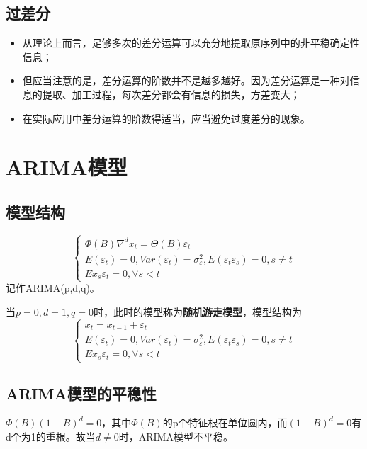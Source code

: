 \documentclass[12pt, a4paper, oneside]{ctexbook}
\begin{document}
\subsection{过差分}
\begin{itemize}
    \item 从理论上而言，足够多次的差分运算可以充分地提取原序列中的非平稳确定性信息；
    \item 但应当注意的是，差分运算的阶数并不是越多越好。因为差分运算是一种对信息的提取、加工过程，每次差分都会有信息的损失，方差变大；
    \item 在实际应用中差分运算的阶数得适当，应当避免过度差分的现象。
\end{itemize}

\section{ARIMA模型}
\subsection{模型结构}
\begin{equation}
    \begin{cases}
        \Phi(B)\nabla^dx_t=\Theta(B)\varepsilon_t\\
        E(\varepsilon_t)=0,Var(\varepsilon_t)=\sigma_\varepsilon^2,E(\varepsilon_t\varepsilon_s)=0,s\neq t\\
        Ex_s\varepsilon_t=0,\forall s<t
    \end{cases}
\end{equation}
记作ARIMA(p,d,q)。

当$p=0,d=1,q =0$时，此时的模型称为\textbf{随机游走模型}，模型结构为
$$
\begin{cases}
    x_t=x_{t-1}+\varepsilon_t\\
    E(\varepsilon_t)=0,Var(\varepsilon_t)=\sigma_\varepsilon^2,E(\varepsilon_t\varepsilon_s)=0,s\neq t\\
    Ex_s\varepsilon_t=0,\forall s<t
\end{cases}
$$

\subsection{ARIMA模型的平稳性}
$\Phi(B)(1-B)^d = 0$，其中$\Phi(B)$的p个特征根在单位圆内，而$(1-B)^d = 0$有d个为1的重根。故当$d\neq 0$时，ARIMA模型不平稳。
\end{document}
